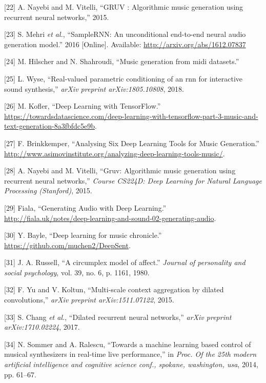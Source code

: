 \documentclass[12pt,]{article}
\begin{document}
\leavevmode\hypertarget{ref-Nayebi2015GRUVA}{}%
{[}22{]} A. Nayebi and M. Vitelli, ``GRUV : Algorithmic music generation
using recurrent neural networks,'' 2015.

\leavevmode\hypertarget{ref-mehri2016samplernn}{}%
{[}23{]} S. Mehri \emph{et al.}, ``SampleRNN: An unconditional
end-to-end neural audio generation model.'' 2016 {[}Online{]}.
Available: \url{http://arxiv.org/abs/1612.07837}

\leavevmode\hypertarget{ref-hilschermusic}{}%
{[}24{]} M. Hilscher and N. Shahroudi, ``Music generation from midi
datasets.''

\leavevmode\hypertarget{ref-wyse2018real}{}%
{[}25{]} L. Wyse, ``Real-valued parametric conditioning of an rnn for
interactive sound synthesis,'' \emph{arXiv preprint arXiv:1805.10808},
2018.

\leavevmode\hypertarget{ref-mkofler}{}%
{[}26{]} M. Kofler, ``Deep Learning with TensorFlow.'' \\
\url{https://towardsdatascience.com/deep-learning-with-tensorflow-part-3-music-and-text-generation-8a3fbfdc5e9b}.

\leavevmode\hypertarget{ref-asimovinst}{}%
{[}27{]} F. Brinkkemper, ``Analysing Six Deep Learning Tools for Music
Generation.'' \\
\url{http://www.asimovinstitute.org/analyzing-deep-learning-tools-music/}.

\leavevmode\hypertarget{ref-nayebi2015gruv}{}%
{[}28{]} A. Nayebi and M. Vitelli, ``Gruv: Algorithmic music generation
using recurrent neural networks,'' \emph{Course CS224D: Deep Learning
for Natural Language Processing (Stanford)}, 2015.

\leavevmode\hypertarget{ref-fiala}{}%
{[}29{]} \relax Fiala, ``Generating Audio with Deep Learning.'' \\
\url{http://fiala.uk/notes/deep-learning-and-sound-02-generating-audio}.

\leavevmode\hypertarget{ref-deepsent}{}%
{[}30{]} Y. Bayle, ``Deep learning for music chronicle.'' \\
\url{https://github.com/muchen2/DeepSent}.

\leavevmode\hypertarget{ref-russell1980circumplex}{}%
{[}31{]} J. A. Russell, ``A circumplex model of affect.'' \emph{Journal
of personality and social psychology}, vol. 39, no. 6, p. 1161, 1980.

\leavevmode\hypertarget{ref-yu2015multi}{}%
{[}32{]} F. Yu and V. Koltun, ``Multi-scale context aggregation by
dilated convolutions,'' \emph{arXiv preprint arXiv:1511.07122}, 2015.

\leavevmode\hypertarget{ref-chang2017dilated}{}%
{[}33{]} S. Chang \emph{et al.}, ``Dilated recurrent neural networks,''
\emph{arXiv preprint arXiv:1710.02224}, 2017.

\leavevmode\hypertarget{ref-sommer2014towards}{}%
{[}34{]} N. Sommer and A. Ralescu, ``Towards a machine learning based
control of musical synthesizers in real-time live performance,'' in
\emph{Proc. Of the 25th modern artificial intelligence and cognitive
science conf., spokane, washington, usa}, 2014, pp. 61--67.
\end{document}

